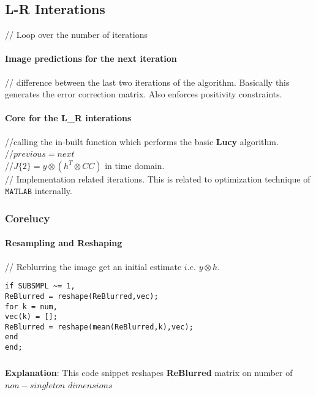 \documentclass[a4paper]{book}
\begin{document}
\subsection{L-R Interations}
// Loop over the number of iterations
\paragraph{Image predictions for the next iteration}
// difference between the last two iterations of the algorithm. Basically this generates the error correction matrix. Also enforces positivity constraints.\cite{matlabpaper2}
\paragraph{Core for the L\_R interations}
//calling the in-built function which performs the basic \textbf{Lucy} algorithm.\\
 //$ previous = next $\\
 //$ J\{2\} = y \otimes \left(h^T \otimes CC\right)$ in time domain.\\
 // Implementation related iterations. This is related to optimization technique of $ \mathtt{MATLAB} $ internally.
\subsubsection{Corelucy}
\paragraph{Resampling and Reshaping}
 // Reblurring the image get an initial estimate $i.e.$ $ y\otimes h $.
\begin{lstlisting}
if SUBSMPL ~= 1,
ReBlurred = reshape(ReBlurred,vec);
for k = num,
vec(k) = [];
ReBlurred = reshape(mean(ReBlurred,k),vec);
end
end;
\end{lstlisting}

\subparagraph*{}\textbf{\small Explanation}: This code snippet reshapes \textbf{\small ReBlurred} matrix on number of $ non-singleton$ $dimensions$ 
\
\end{document}
